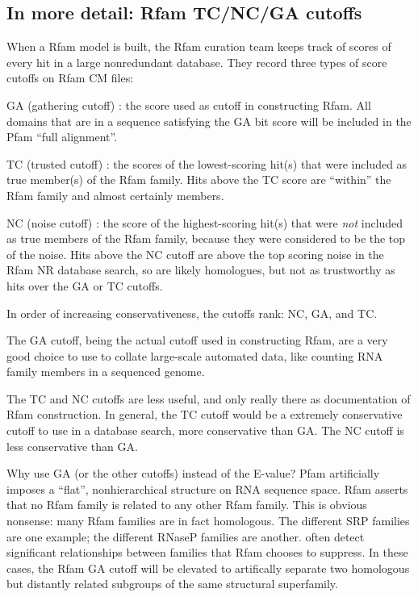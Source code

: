 \subsection{In more detail: Rfam TC/NC/GA cutoffs}

When a Rfam model is built, the Rfam curation team keeps track of
scores of every hit in a large nonredundant database. They record
three types of score cutoffs on Rfam CM files:

\begin{wideitem}
\item[GA (gathering cutoff)]: the score used as cutoff in
constructing Rfam. All domains that are in a sequence satisfying the
GA bit score will be included in the Pfam ``full alignment''.

\item[TC (trusted cutoff)]: the scores of the lowest-scoring hit(s)
that were included as true member(s) of the Rfam family. Hits above
the TC score are ``within'' the Rfam family and almost certainly
members.

\item[NC (noise cutoff)]: the score of the highest-scoring hit(s) that
were \textit{not} included as true members of the Rfam family, because
they were considered to be the top of the noise.  Hits above the NC
cutoff are above the top scoring noise in the Rfam NR database search,
so are likely homologues, but not as trustworthy as hits over the GA
or TC cutoffs.
\end{wideitem}

In order of increasing conservativeness, the cutoffs rank: NC, GA, and
TC.

The GA cutoff, being the actual cutoff used in constructing Rfam,
are a very good choice to use to collate large-scale automated data,
like counting RNA family members in a sequenced genome.

The TC and NC cutoffs are less useful, and only really there as
documentation of Rfam construction. In general, the TC cutoff would
be a extremely conservative cutoff to use in a database search, more
conservative than GA. The NC cutoff is less conservative than GA.

Why use GA (or the other cutoffs) instead of the E-value? Pfam
artificially imposes a ``flat'', nonhierarchical structure on RNA
sequence space.  Rfam asserts that no Rfam family is related to any
other Rfam family. This is obvious nonsense: many Rfam families are in
fact homologous.  The different SRP families are one example; the
different RNaseP families are another.  often
detect significant relationships between families that Rfam chooses to
suppress. In these cases, the Rfam GA cutoff will be elevated to
artifically separate two homologous but distantly related subgroups of
the same structural superfamily.


